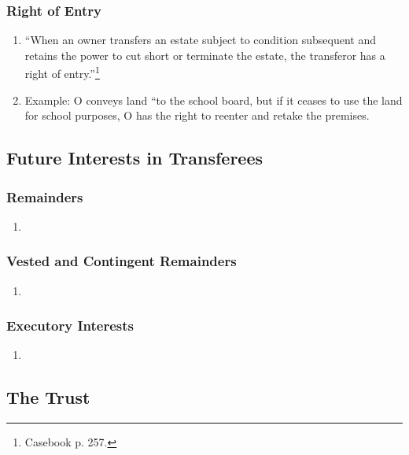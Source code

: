 \subsubsection{Right of Entry}

\begin{enumerate}
    \item ``When an owner transfers an estate subject to condition subsequent 
    and retains the power to cut short or terminate the estate, the transferor 
    has a right of entry.''\footnote{Casebook p. 257.}
    \item Example: O conveys land ``to the school board, but if it ceases to 
    use the land for school purposes, O has the right to reenter and retake 
    the premises.
\end{enumerate}

\subsection{Future Interests in Transferees}

\subsubsection{Remainders}

\begin{enumerate}
    \item %
\end{enumerate}

\subsubsection{Vested and Contingent Remainders}

\begin{enumerate}
    \item %
\end{enumerate}

\subsubsection{Executory Interests}

\begin{enumerate}
    \item %
\end{enumerate}

\subsection{The Trust}

